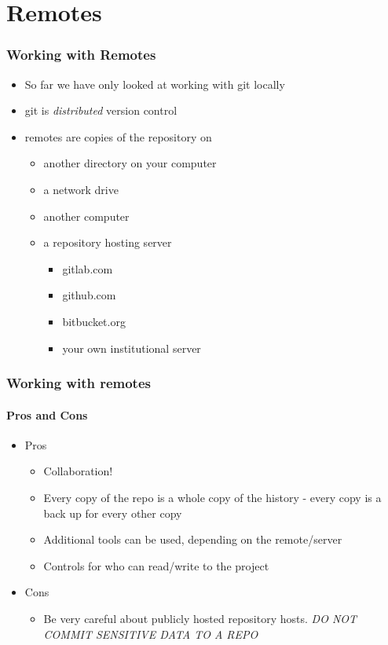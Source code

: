 \section{Remotes}
\begin{frame}
  \frametitle{Working with Remotes}
  \begin{itemize}
    \item So far we have only looked at working with git locally
    \item git is \emph{distributed} version control
    \item remotes are copies of the repository on
      \begin{itemize}
        \item another directory on your computer
        \item a network drive
        \item another computer
        \item a repository hosting server
          \begin{itemize}
            \item gitlab.com
            \item github.com
            \item bitbucket.org
            \item your own institutional server
          \end{itemize}
      \end{itemize}
  \end{itemize}
\end{frame}

\begin{frame}
  \frametitle{Working with remotes}
  \framesubtitle{Pros and Cons}
  \begin{itemize}
    \item Pros
      \begin{itemize}
        \item Collaboration!
        \item Every copy of the repo is a whole copy of the history - every
          copy is a back up for every other copy
        \item Additional tools can be used, depending on the remote/server
        \item Controls for who can read/write to the project
      \end{itemize}
    \item Cons
      \begin{itemize}
        \item Be very careful about publicly hosted repository hosts.  \emph{DO
          NOT COMMIT SENSITIVE DATA TO A REPO}
      \end{itemize}
  \end{itemize}
\end{frame}

